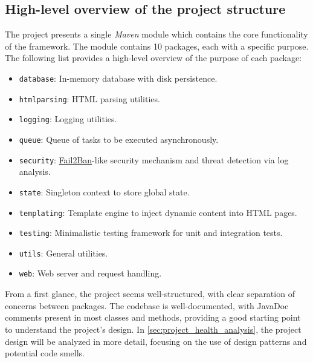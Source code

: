 \subsection{High-level overview of the project structure}
\label{sec:project_structure}

The project presents a single \textit{Maven} module which contains the core functionality of the framework. The module contains 10 packages, each with a specific purpose. The following list provides a high-level overview of the purpose of each package:

\vspace{1em}
\noindent
\begin{minipage}{0.5\textwidth}
	\begin{itemize}
		\item \texttt{database}: In-memory database with disk persistence.
		\item \texttt{htmlparsing}: HTML parsing utilities.
		\item \texttt{logging}: Logging utilities.
		\item \texttt{queue}: Queue of tasks to be executed asynchronously.
		\item \texttt{security}: \href{https://github.com/fail2ban/fail2ban}{Fail2Ban}-like security mechanism and threat detection via log analysis.
	\end{itemize}
\end{minipage}
\begin{minipage}{0.5\textwidth}
	\begin{itemize}
		\item \texttt{state}: Singleton context to store global state.
		\item \texttt{templating}: Template engine to inject dynamic content into HTML pages.
		\item \texttt{testing}: Minimalistic testing framework for unit and integration tests.
		\item \texttt{utils}: General utilities.
		\item \texttt{web}: Web server and request handling.
	\end{itemize}
\end{minipage}
\vspace{1em}

\noindent From a first glance, the project seems well-structured, with clear separation of concerns between packages. The codebase is well-documented, with JavaDoc comments present in most classes and methods, providing a good starting point to understand the project's design. In \autoref{sec:project_health_analysis}, the project design will be analyzed in more detail, focusing on the use of design patterns and potential code smells.

